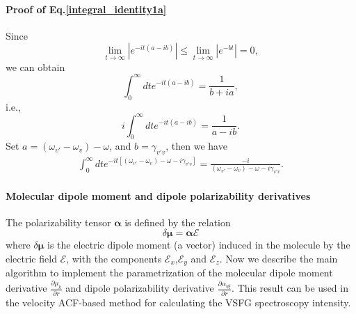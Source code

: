 \paragraph{Proof of Eq.\thinspace\ref{integral_identity1a}}
Since 
\begin{equation}
  \lim_{t\to\infty} |e^{-it(a-ib)}|\le \lim_{t\to\infty} |e^{-bt}| = 0,
  \label{integral_identity0}
\end{equation}
we can obtain
\begin{equation}
  \int_0^\infty dt e^{-it(a-ib)}=\frac{1}{b+ia},
  \label{integral_identity0}
\end{equation}
i.e.,
\begin{equation}
  i\int_0^\infty dt e^{-it(a-ib)}=\frac{1}{a-ib}.
  \label{integral_identity1}
\end{equation}
Set $a = (\omega_{v'} - \omega_{v}) - \omega$, and $b = \gamma_{v'v}$,
then we have
 \begin{align}
 \int_0^\infty dt e^{-it[(\omega_{v'}-\omega_v)-\omega-i\gamma_{v'v}]}=\frac{-i}{(\omega_{v'} -\omega_v)-\omega-i\gamma_{v'v}}.\nonumber
 \end{align}

\paragraph{Molecular dipole moment and dipole polarizability derivatives} \label{calculate_derivatives} 

The polarizability tensor $\boldsymbol{\alpha}$ is defined by the relation
\begin{equation}
  \delta \boldsymbol{\mu} = \boldsymbol{\alpha} \boldsymbol{\mathscr{E}}
  \label{eq:def_alpha}
\end{equation}
where $\delta \boldsymbol{\mu}$ is the electric dipole moment (a vector) induced in the molecule by
the electric field $\boldsymbol{\mathscr{E}}$, with the components $\mathscr{E}_x$,$\mathscr{E}_y$ and $\mathscr{E}_z$.
Now we describe the main algorithm to implement the parametrization of the molecular dipole moment 
derivative $\frac{\partial \mu_k}{\partial r}$ and dipole polarizability derivative $\frac{\partial\alpha_{\eta\xi}}{\partial r}$. 
This result can be used in the velocity ACF-based method for calculating the VSFG spectroscopy intensity.

